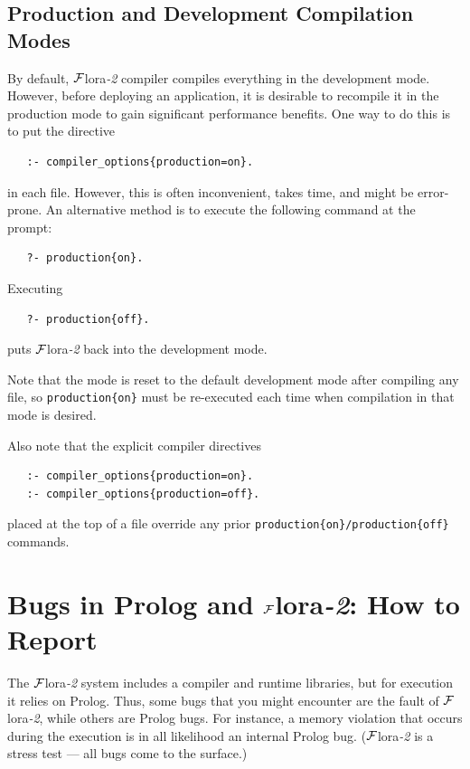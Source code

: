 \documentclass[11pt]{article}
\newcommand{\FLORA}{{\mbox{\sc ${\cal F}${lora}\rm\emph{-2}}}\xspace}
\newcommand{\FLSYSTEM}{\FLORA}
\begin{document}
\subsection{Production and Development Compilation  Modes}
\label{sec-production-shell}

By default, \FLSYSTEM compiler compiles everything in the development
mode. However, before deploying an application, it is desirable to
recompile it in the production mode to gain significant performance benefits.
One way to do this is to put the directive
\begin{verbatim}
   :- compiler_options{production=on}.
\end{verbatim}
in each file. However, this is often inconvenient, takes time, and might be
error-prone. An alternative method is to execute the following command at
the prompt:
\begin{verbatim}
   ?- production{on}.
\end{verbatim}
Executing
\begin{verbatim}
   ?- production{off}.
\end{verbatim}
puts \FLSYSTEM back into the development mode.

Note that the mode is reset to the default development mode after compiling
any file, so \texttt{production\{on\}} must be re-executed each time
when compilation in that mode is desired.

Also note that the explicit compiler directives
\begin{verbatim}
   :- compiler_options{production=on}.
   :- compiler_options{production=off}.
\end{verbatim}
placed at the top of a file override any prior
\texttt{production\{on\}/production\{off\}} commands. 
 


\section{Bugs in Prolog and \FLSYSTEM: How to Report}

The \FLSYSTEM system includes a compiler and runtime libraries, but for
execution it relies on Prolog. Thus, some bugs that you might encounter are
the fault of \FLSYSTEM, while others are Prolog bugs. For instance, a memory
violation that occurs during the execution is in all likelihood an internal
Prolog bug. (\FLSYSTEM is a stress test --- all bugs come to the surface.)
\end{document}
